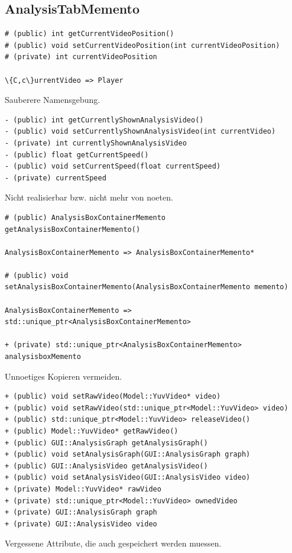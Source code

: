 \documentclass[parskip=full]{scrartcl}
\begin{document}
\subsection{AnalysisTabMemento}
\begin{verbatim}
# (public) int getCurrentVideoPosition()
# (public) void setCurrentVideoPosition(int currentVideoPosition)
# (private) int currentVideoPosition

\{C,c\}urrentVideo => Player
\end{verbatim}
Sauberere Namensgebung.
\begin{verbatim}
- (public) int getCurrentlyShownAnalysisVideo()
- (public) void setCurrentlyShownAnalysisVideo(int currentVideo)
- (private) int currentlyShownAnalysisVideo
- (public) float getCurrentSpeed()
- (public) void setCurrentSpeed(float currentSpeed)
- (private) currentSpeed
\end{verbatim}
Nicht realisierbar bzw. nicht mehr von noeten.
\begin{verbatim}
# (public) AnalysisBoxContainerMemento getAnalysisBoxContainerMemento()

AnalysisBoxContainerMemento => AnalysisBoxContainerMemento*

# (public) void setAnalysisBoxContainerMemento(AnalysisBoxContainerMemento memento)

AnalysisBoxContainerMemento => std::unique_ptr<AnalysisBoxContainerMemento>

+ (private) std::unique_ptr<AnalysisBoxContainerMemento> analysisboxMemento
\end{verbatim}
Unnoetiges Kopieren vermeiden.
\begin{verbatim}
+ (public) void setRawVideo(Model::YuvVideo* video)
+ (public) void setRawVideo(std::unique_ptr<Model::YuvVideo> video)
+ (public) std::unique_ptr<Model::YuvVideo> releaseVideo()
+ (public) Model::YuvVideo* getRawVideo()
+ (public) GUI::AnalysisGraph getAnalysisGraph()
+ (public) void setAnalysisGraph(GUI::AnalysisGraph graph)
+ (public) GUI::AnalysisVideo getAnalysisVideo()
+ (public) void setAnalysisVideo(GUI::AnalysisVideo video)
+ (private) Model::YuvVideo* rawVideo
+ (private) std::unique_ptr<Model::YuvVideo> ownedVideo
+ (private) GUI::AnalysisGraph graph
+ (private) GUI::AnalysisVideo video
\end{verbatim}
Vergessene Attribute, die auch gespeichert werden muessen.
\end{document}
